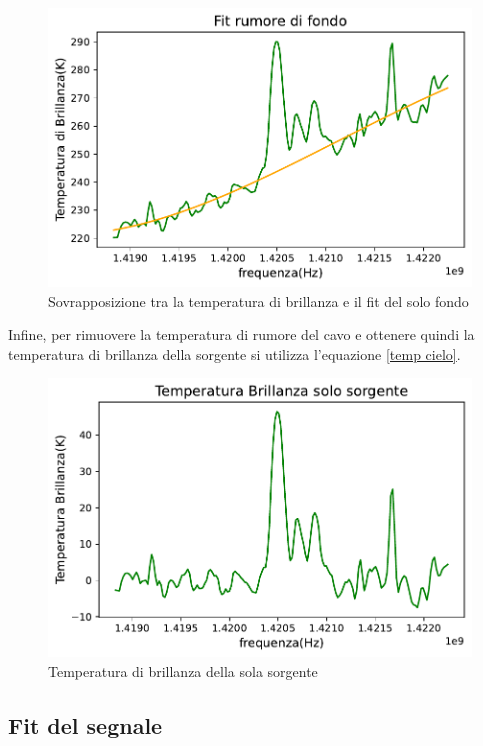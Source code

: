 \begin{figure}[H]
	\centering
	\includegraphics[scale=0.8]{Fit rumore di fondo.pdf}
	\caption{Sovrapposizione tra la temperatura di brillanza e il fit del solo fondo}
    	\label{fig:Fit rumore di fondo}
\end{figure}


Infine, per rimuovere la temperatura di rumore del cavo e ottenere quindi la temperatura di brillanza della sorgente si utilizza l'equazione \eqref{temp cielo}.

\begin{figure}[H]
	\centering
	\includegraphics[scale=0.8]{Temperatura_finale.pdf}
	\caption{Temperatura di brillanza della sola sorgente}
    	\label{fig:Temperatura_finale}
\end{figure}

\subsection{Fit del segnale}

